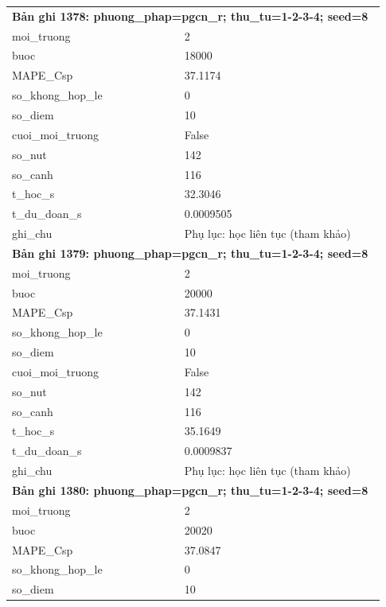 \begin{longtable}{p{0.43\linewidth}p{0.50\linewidth}}
\midrule
\multicolumn{2}{p{0.95\linewidth}}{\textbf{Bản ghi 1378: phuong\_phap=pgcn\_r; thu\_tu=1-2-3-4; seed=8}} \\
moi\_\allowbreak truong & 2 \\
buoc & 18000 \\
MAPE\_\allowbreak Csp & 37.1174 \\
so\_\allowbreak khong\_\allowbreak hop\_\allowbreak le & 0 \\
so\_\allowbreak diem & 10 \\
cuoi\_\allowbreak moi\_\allowbreak truong & False \\
so\_\allowbreak nut & 142 \\
so\_\allowbreak canh & 116 \\
t\_\allowbreak hoc\_\allowbreak s & 32.3046 \\
t\_\allowbreak du\_\allowbreak doan\_\allowbreak s & 0.0009505 \\
ghi\_\allowbreak chu & Phụ lục: học liên tục (tham khảo) \\
\midrule
\multicolumn{2}{p{0.95\linewidth}}{\textbf{Bản ghi 1379: phuong\_phap=pgcn\_r; thu\_tu=1-2-3-4; seed=8}} \\
moi\_\allowbreak truong & 2 \\
buoc & 20000 \\
MAPE\_\allowbreak Csp & 37.1431 \\
so\_\allowbreak khong\_\allowbreak hop\_\allowbreak le & 0 \\
so\_\allowbreak diem & 10 \\
cuoi\_\allowbreak moi\_\allowbreak truong & False \\
so\_\allowbreak nut & 142 \\
so\_\allowbreak canh & 116 \\
t\_\allowbreak hoc\_\allowbreak s & 35.1649 \\
t\_\allowbreak du\_\allowbreak doan\_\allowbreak s & 0.0009837 \\
ghi\_\allowbreak chu & Phụ lục: học liên tục (tham khảo) \\
\midrule
\multicolumn{2}{p{0.95\linewidth}}{\textbf{Bản ghi 1380: phuong\_phap=pgcn\_r; thu\_tu=1-2-3-4; seed=8}} \\
moi\_\allowbreak truong & 2 \\
buoc & 20020 \\
MAPE\_\allowbreak Csp & 37.0847 \\
so\_\allowbreak khong\_\allowbreak hop\_\allowbreak le & 0 \\
so\_\allowbreak diem & 10 \\

\end{longtable}

